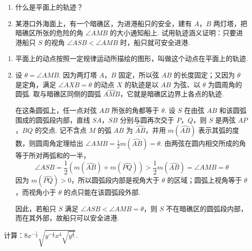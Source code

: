 \begin{problem}
\begin{enumerate}
\item 什么是平面上的轨迹？
\item 某港口外海面上，有一个暗礁区，为进港船只的安全，建有 \(A\)，\(B\) 两灯塔，把暗礁区所张的危险的角 \(\angle AMB\) 的大小通知船上. 试用轨迹涵义证明：只要进港船只 \(S\) 的视角 \(\angle ASB<\angle AMB\) 时，船只就可安全进港.
\end{enumerate}
\end{problem}

\begin{solution}
\begin{enumerate}
\item 平面上的动点按照一定规律运动所描绘的图形，叫做这个动点在平面上的轨迹.

\item 设 \(\theta=\angle AMB\). 因为两灯塔 \(A\)，\(B\) 固定，所以弦 \(AB\) 的长度固定；又因为 \(\theta\) 是定角，满足 \(\angle AXB=\theta\) 的动点 \(X\) 的轨迹是以 \(AB\) 为弦、以 \(\theta\) 为圆周角的圆弧. 取与暗礁区同侧的圆弧 \(\widehat{AMB}\)，它就是暗礁区边界上各点的轨迹.


在这条圆弧上，任一点对弦 \(AB\) 所张的角都等于 \(\theta\). 设 \(S\) 在由弦 \(AB\) 和该圆弧围成的圆弧段内部，直线 \(SA\)，\(SB\) 分别与圆再次交于 \(P\)，\(Q\)，则 \(S\) 是两弦 \(AP\)，\(BQ\) 的交点. 记不含点 \(M\) 的弧 \(AB\) 为 \(\widehat{AB}\)，并用 \(m(\widehat{AB})\) 表示其弧的度数，则圆周角定理给出 \(\angle AMB=\frac{1}{2}m(\widehat{AB})=\theta\). 由两弦在圆内相交所成的角等于所对两弧和的一半，
\[
\angle ASB=\frac{1}{2}\left(m(\widehat{AB})+m(\widehat{PQ})\right)>\frac{1}{2}m(\widehat{AB})=\angle AMB=\theta
\]
因为 \(m(\widehat{PQ})>0\)，所以圆弧段内部是视角大于 \(\theta\) 的区域；圆弧上视角等于 \(\theta\)，而视角小于 \(\theta\) 的点只能在该圆弧段外部.

因此，若船只 \(S\) 满足 \(\angle ASB<\angle AMB=\theta\)，则 \(S\) 不在暗礁区的圆弧段内部，而在其外部，故船只可以安全进港.
\end{enumerate}
\end{solution}

\begin{problem}
计算：\(8x^{-\frac{1}{3}}\sqrt{y^{-\frac{1}{3}}x^4\sqrt{y^{\frac{4}{3}}}}\).
\end{problem}

